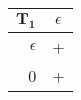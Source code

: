 \begingroup
\scriptsize
\begin{tabular}{r | c}
    $\mathbf{T_1}$ & $\epsilon$ \\ \hline
    $\epsilon$ & + \\ \hline
    0 & +
\end{tabular}
\endgroup
